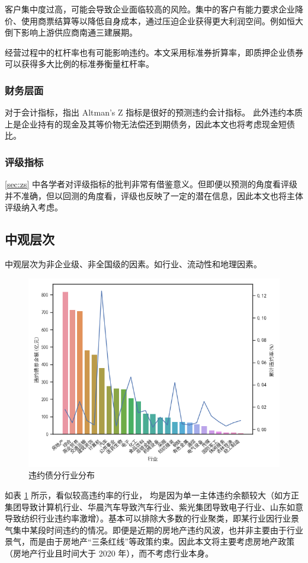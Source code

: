 客户集中度过高，可能会导致企业面临较高的风险\autocite{王雄元2017客户集中度与公司债二级市场信用利差}。集中的客户有能力要求企业降价、使用商票结算等以降低自身成本，通过压迫企业获得更大利润空间。例如恒大倒下影响上游供应商南通三建展期。

经营过程中的杠杆率也有可能影响违约\autocite{王永钦2019杠杆率如何影响资产价格}。本文采用标准券折算率，即质押企业债券可以获得多大比例的标准券衡量杠杆率。
\subsubsection{财务层面}
对于会计指标，\Textcite{blochlinger2018ratings}指出 Altman's Z 指标是很好的预测违约会计指标。
此外违约本质上是企业持有的现金及其等价物无法偿还到期债务，因此本文也将考虑现金短债比。
\subsubsection{评级指标}
\ref{sec:zs} 中各学者对评级指标的批判非常有借鉴意义。但即便以预测的角度看评级并不准确，但以回测的角度看，评级也反映了一定的潜在信息，因此本文也将主体评级纳入考虑。
\subsection{中观层次}
中观层次为非企业级、非全国级的因素。如行业、流动性和地理因素。

\begin{figure}[htbp]
	\centering
	\includegraphics[width=.9\linewidth]{./data/industry.png}
	\caption{\label{fig:industry}违约债分行业分布}
\end{figure}

如表 \ref{fig:industry} 所示，看似较高违约率的行业，
均是因为单一主体违约余额较大（如方正集团导致计算机行业、华晨汽车导致汽车行业、紫光集团导致电子行业、山东如意导致纺织行业违约率激增）。基本可以排除大多数的行业聚类\autocite{azizpour2018exploring}，即某行业因行业景气集中某段时间违约的情况。即便是近期的房地产违约风波，也并非主要由于行业景气，而是由于房地产“三条红线”等政策约束。因此本文将主要考虑房地产政策（房地产行业且时间大于 2020 年），而不考虑行业本身。

